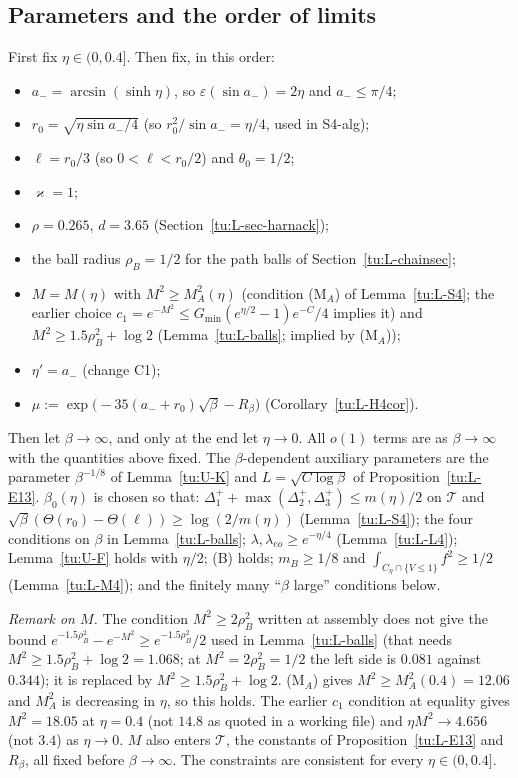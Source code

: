 \subsection{Parameters and the order of limits}
First fix $\eta\in(0,0.4]$. Then fix, in this order:
\begin{itemize}
\item $a_-=\arcsin(\sinh\eta)$, so $\varepsilon(\sin a_-)=2\eta$ and $a_-\le\pi/4$;
\item $r_0=\sqrt{\eta\sin a_-/4}$ (so $r_0^2/\sin a_-=\eta/4$, used in S4-alg);
\item $\ell=r_0/3$ (so $0<\ell<r_0/2$) and $\theta_0=1/2$;
\item $\varkappa=1$;
\item $\rho=0.265$, $d=3.65$ (Section~\ref{tu:L-sec-harnack});
\item the ball radius $\rho_B=1/2$ for the path balls of Section~\ref{tu:L-chainsec};
\item $M=M(\eta)$ with $M^2\ge M_A^2(\eta)$ (condition (M$_A$) of Lemma~\ref{tu:L-S4}; the earlier choice $c_1=e^{-M^2}\le G_{\min}(e^{\eta/2}-1)e^{-C}/4$ implies it) and $M^2\ge1.5\rho_B^2+\log2$ (Lemma~\ref{tu:L-balls}; implied by (M$_A$));
\item $\eta'=a_-$ (change C1);
\item $\mu:=\exp\big(-35(a_-+r_0)\sqrt\beta-R_\beta\big)$ (Corollary~\ref{tu:L-H4cor}).
\end{itemize}
Then let $\beta\to\infty$, and only at the end let $\eta\to0$. All $o(1)$ terms are as $\beta\to\infty$ with the quantities above
fixed. The $\beta$-dependent auxiliary parameters are the parameter $\beta^{-1/8}$ of Lemma~\ref{tu:U-K} and $L=\sqrt{C\log\beta}$ of
Proposition~\ref{tu:L-E13}. $\beta_0(\eta)$ is chosen so that: $\Delta_1^++\max(\Delta_2^+,\Delta_3^+)\le m(\eta)/2$ on $\mathcal T$ and $\sqrt\beta(\Theta(r_0)-\Theta(\ell))\ge\log(2/m(\eta))$ (Lemma~\ref{tu:L-S4}); the four conditions on $\beta$ in Lemma~\ref{tu:L-balls};
$\lambda,\lambda_{eo}\ge e^{-\eta/4}$ (Lemma~\ref{tu:L-L4}); Lemma~\ref{tu:U-F} holds with $\eta/2$; (B) holds; $m_B\ge1/8$ and
$\int_{C_\eta\cap\{V\le1\}}f^2\ge1/2$ (Lemma~\ref{tu:L-M4}); and the finitely many ``$\beta$ large'' conditions below.

\noindent\emph{Remark on $M$.} The condition $M^2\ge2\rho_B^2$ written at assembly does not give the bound
$e^{-1.5\rho_B^2}-e^{-M^2}\ge e^{-1.5\rho_B^2}/2$ used in Lemma~\ref{tu:L-balls} (that needs $M^2\ge1.5\rho_B^2+\log2=1.068$; at $M^2=2\rho_B^2=1/2$
the left side is $0.081$ against $0.344$); it is replaced by $M^2\ge1.5\rho_B^2+\log2$. (M$_A$) gives $M^2\ge M_A^2(0.4)=12.06$ and
$M_A^2$ is decreasing in $\eta$, so this holds. The earlier $c_1$ condition at equality gives $M^2=18.05$ at $\eta=0.4$ (not $14.8$ as
quoted in a working file) and $\eta M^2\to4.656$ (not $3.4$) as $\eta\to0$. $M$ also enters $\mathcal T$, the constants of
Proposition~\ref{tu:L-E13} and $R_\beta$, all fixed before $\beta\to\infty$. The constraints are consistent for every $\eta\in(0,0.4]$.

